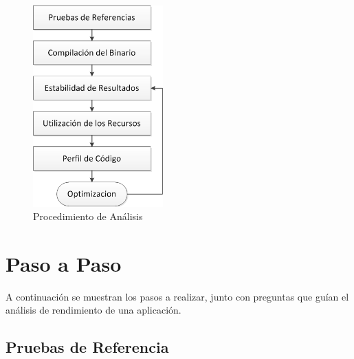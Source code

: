 \documentclass[a4paper]{report}
\begin{document}
\begin{figure}[H]
\label{fig:procedure}
\begin{center}
\includegraphics[width=5cm]{procedure.png}
\caption{Procedimiento de Análisis}
\end{center}
\end{figure}

\section{Paso a Paso}

A continuación se muestran los pasos a realizar, junto con preguntas que guían el análisis de rendimiento de una aplicación.

\subsection{Pruebas de Referencia}
\end{document}
